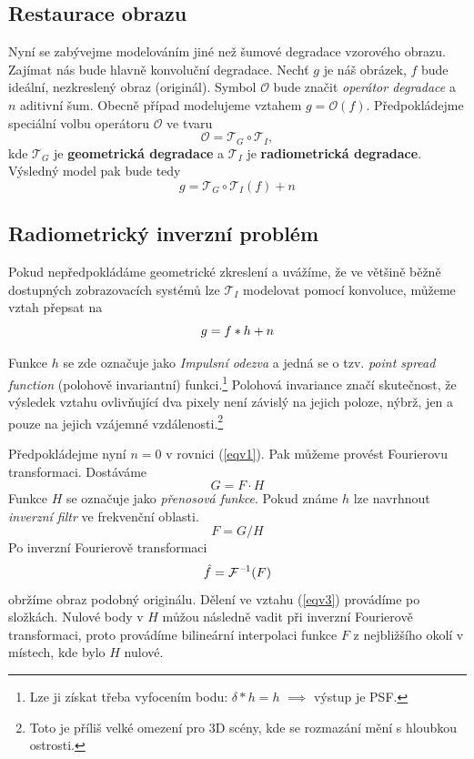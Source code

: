 \subsection{Restaurace obrazu}
Nyní se zabývejme modelováním jiné než šumové degradace vzorového obrazu. Zajímat nás bude hlavně konvoluční degradace. Nechť $g$ je náš obrázek, $f$ bude ideální, nezkreslený obraz (originál). Symbol $\mathcal{O}$ bude značit \emph{operátor degradace} a $n$ aditivní šum. Obecně případ modelujeme vztahem $g=\mathcal{O} (f)$. Předpokládejme speciální volbu operátoru $\mathcal{O}$ ve tvaru
\begin{equation}
\mathcal{O} = \mathcal{T}_G\circ \mathcal{T}_I,
\end{equation}
kde $\mathcal{T}_G$ je \textbf{geometrická degradace} a $\mathcal{T}_I$ je \textbf{radiometrická degradace}. Výsledný model pak bude tedy
\begin{equation}
g = \mathcal{T}_G\circ \mathcal{T}_I (f) +n
\end{equation}

\subsection{Radiometrický inverzní problém}

Pokud nepředpokládáme geometrické zkreslení a uvážíme, že ve většině běžně dostupných zobrazovacích systémů lze $\mathcal{T}_I$ modelovat pomocí konvoluce, můžeme vztah přepsat na
\begin{equation}
g = f\ast h +n \label{eqv1}
\end{equation}

Funkce $h$ se zde označuje jako \emph{Impulsní odezva} a jedná se o tzv. \emph{point spread function} (polohově invariantní) funkci.\footnote{Lze ji získat třeba vyfocením bodu: $ \delta * h = h $ $ \implies $ výstup je PSF.} Polohová invariance značí skutečnost, že výsledek vztahu ovlivňující dva pixely není závislý na jejich poloze, nýbrž, jen a pouze na jejich vzájemné vzdálenosti.\footnote{Toto je příliš velké omezení pro 3D scény, kde se rozmazání mění s hloubkou ostrosti.}

Předpokládejme nyní $n=0$ v rovnici (\ref{eqv1}). Pak můžeme provést Fourierovu transformaci. Dostáváme
\begin{equation}
G = F\cdot H \label{eqv2}
\end{equation}
Funkce $H$ se označuje jako \emph{přenosová funkce}. Pokud známe $h$ lze navrhnout \emph{inverzní filtr} ve frekvenční oblasti.
\begin{equation}
F = G/H\label{eqv3}
\end{equation}
Po inverzní Fourierově transformaci
\begin{equation}
\hat{f} = \operatorname{\mathcal{F}^{\, --1}}(F)
\end{equation}
obržíme obraz podobný originálu. Dělení ve vztahu (\ref{eqv3}) provádíme po složkách. Nulové body v $H$ můžou následně vadit při inverzní Fourierově transformaci, proto provádíme bilineární interpolaci funkce $F$ z nejbližšího okolí v místech, kde bylo $H$ nulové.



